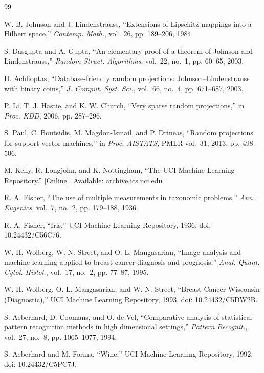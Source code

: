 \begin{thebibliography}{99}

W. B. Johnson and J. Lindenstrauss, ``Extensions of Lipschitz mappings into a Hilbert space,'' \emph{Contemp. Math.}, vol.~26, pp. 189--206, 1984.

S. Dasgupta and A. Gupta, ``An elementary proof of a theorem of Johnson and Lindenstrauss,'' \emph{Random Struct. Algorithms}, vol.~22, no.~1, pp. 60--65, 2003.

D. Achlioptas, ``Database-friendly random projections: Johnson--Lindenstrauss with binary coins,'' \emph{J. Comput. Syst. Sci.}, vol.~66, no.~4, pp. 671--687, 2003.

P. Li, T. J. Hastie, and K. W. Church, ``Very sparse random projections,'' in \emph{Proc. KDD}, 2006, pp. 287--296.

S. Paul, C. Boutsidis, M. Magdon-Ismail, and P. Drineas, ``Random projections for support vector machines,'' in \emph{Proc. AISTATS}, PMLR vol.~31, 2013, pp. 498--506.

M. Kelly, R. Longjohn, and K. Nottingham, ``The UCI Machine Learning Repository.'' [Online]. Available: archive.ics.uci.edu

R. A. Fisher, ``The use of multiple measurements in taxonomic problems,'' \emph{Ann. Eugenics}, vol.~7, no.~2, pp. 179--188, 1936.

R. A. Fisher, ``Iris,'' UCI Machine Learning Repository, 1936, doi: 10.24432/C56C76.

W. H. Wolberg, W. N. Street, and O. L. Mangasarian, ``Image analysis and machine learning applied to breast cancer diagnosis and prognosis,'' \emph{Anal. Quant. Cytol. Histol.}, vol.~17, no.~2, pp. 77--87, 1995.

W. H. Wolberg, O. L. Mangasarian, and W. N. Street, ``Breast Cancer Wisconsin (Diagnostic),'' UCI Machine Learning Repository, 1993, doi: 10.24432/C5DW2B.

S. Aeberhard, D. Coomans, and O. de Vel, ``Comparative analysis of statistical pattern recognition methods in high dimensional settings,'' \emph{Pattern Recognit.}, vol.~27, no.~8, pp. 1065--1077, 1994.

S. Aeberhard and M. Forina, ``Wine,'' UCI Machine Learning Repository, 1992, doi: 10.24432/C5PC7J.


\end{thebibliography}
